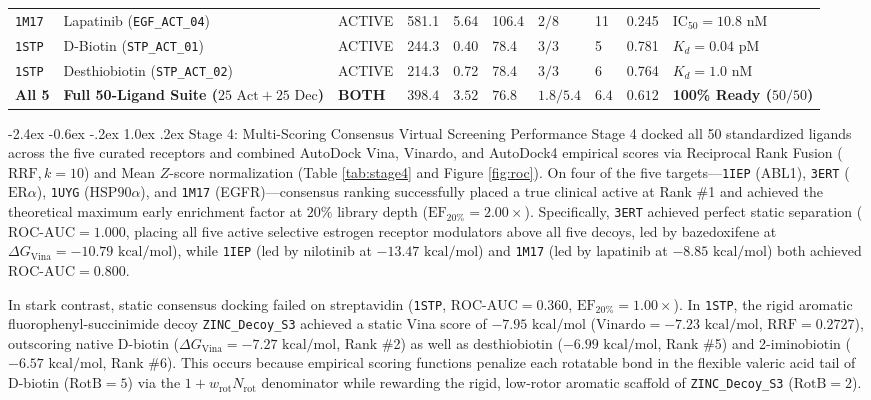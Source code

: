 \documentclass[11pt,a4paper]{article}
\makeatletter
\renewcommand{\subsection}{\@startsection{subsection}{2}{\z@}%
  {-2.4ex \@plus -0.6ex \@minus -.2ex}%
  {1.0ex \@plus .2ex}%
  {\normalfont\large\bfseries\color{primary}}}
\makeatother
\begin{document}
\begin{table}[!htbp]
{\begin{tabularx}{\textwidth}{L{0.85cm} L{2.8cm} C{1.15cm} R{1.1cm} R{0.9cm} R{1.15cm} C{1.25cm} C{0.8cm} R{0.85cm} Y}
\texttt{1M17} & Lapatinib (\texttt{EGF\_ACT\_04}) & ACTIVE & 581.1 & 5.64 & 106.4 & $2 / 8$ & 11 & 0.245 & $\text{IC}_{50} = 10.8\text{ nM}$ \\
\texttt{1STP} & D-Biotin (\texttt{STP\_ACT\_01}) & ACTIVE & 244.3 & 0.40 & 78.4 & $3 / 3$ & 5 & 0.781 & $K_d = 0.04\text{ pM}$ \\
\texttt{1STP} & Desthiobiotin (\texttt{STP\_ACT\_02}) & ACTIVE & 214.3 & 0.72 & 78.4 & $3 / 3$ & 6 & 0.764 & $K_d = 1.0\text{ nM}$ \\
\textbf{All 5} & \textbf{Full 50-Ligand Suite ($25\text{ Act} + 25\text{ Dec}$)} & \textbf{BOTH} & $\mathbf{398.4}$ & $\mathbf{3.52}$ & $\mathbf{76.8}$ & $\mathbf{1.8 / 5.4}$ & $\mathbf{6.4}$ & $\mathbf{0.612}$ & \textbf{100\% Ready ($50/50$)} \\
\bottomrule
\end{tabularx}
}
\end{table}

\subsection{Stage 4: Multi-Scoring Consensus Virtual Screening Performance}
\noindent Stage 4 docked all 50 standardized ligands across the five curated receptors and combined AutoDock Vina, Vinardo, and AutoDock4 empirical scores via Reciprocal Rank Fusion ($\text{RRF}, k = 10$) and Mean $Z$-score normalization (Table \ref{tab:stage4} and Figure \ref{fig:roc}). On four of the five targets---\texttt{1IEP} (ABL1), \texttt{3ERT} ($\text{ER}\alpha$), \texttt{1UYG} ($\text{HSP90}\alpha$), and \texttt{1M17} (EGFR)---consensus ranking successfully placed a true clinical active at Rank \#1 and achieved the theoretical maximum early enrichment factor at $20\%$ library depth ($\text{EF}_{20\%} = 2.00\times$). Specifically, \texttt{3ERT} achieved perfect static separation ($\text{ROC-AUC} = 1.000$, placing all five active selective estrogen receptor modulators above all five decoys, led by bazedoxifene at $\Delta G_{\text{Vina}} = -10.79\text{ kcal/mol}$), while \texttt{1IEP} (led by nilotinib at $-13.47\text{ kcal/mol}$) and \texttt{1M17} (led by lapatinib at $-8.85\text{ kcal/mol}$) both achieved $\text{ROC-AUC} = 0.800$.

In stark contrast, static consensus docking failed on streptavidin (\texttt{1STP}, $\text{ROC-AUC} = 0.360$, $\text{EF}_{20\%} = 1.00\times$). In \texttt{1STP}, the rigid aromatic fluorophenyl-succinimide decoy \texttt{ZINC\_Decoy\_S3} achieved a static Vina score of $-7.95\text{ kcal/mol}$ ($\text{Vinardo} = -7.23\text{ kcal/mol}$, $\text{RRF} = 0.2727$), outscoring native D-biotin ($\Delta G_{\text{Vina}} = -7.27\text{ kcal/mol}$, Rank \#2) as well as desthiobiotin ($-6.99\text{ kcal/mol}$, Rank \#5) and 2-iminobiotin ($-6.57\text{ kcal/mol}$, Rank \#6). This occurs because empirical scoring functions penalize each rotatable bond in the flexible valeric acid tail of D-biotin ($\text{RotB} = 5$) via the $1 + w_{\text{rot}} N_{\text{rot}}$ denominator while rewarding the rigid, low-rotor aromatic scaffold of \texttt{ZINC\_Decoy\_S3} ($\text{RotB} = 2$).
\end{document}
